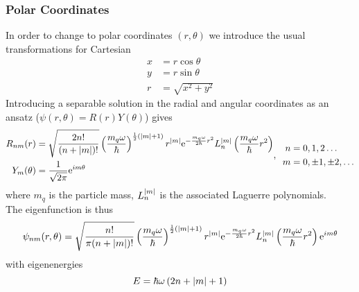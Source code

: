 \documentclass[a4paper, hidelinks, 10pt]{article}
\newcommand{\me}{\mathrm{e}} %
\begin{document}
\subsubsection{Polar Coordinates}
\label{ssub:Polar Coordinates}
    In order to change to polar coordinates $(r,\theta)$ we introduce the usual
    transformations for Cartesian
        \begin{equation}
            \begin{aligned}
                x &= r\cos{\theta} \\
                y &= r\sin{\theta} \\
                r &= \sqrt{x^2 + y^2}
            \end{aligned}
            \label{eq:polar}
        \end{equation}
    Introducing a separable solution in the radial and angular coordinates as
    an ansatz ($\psi(r,\theta)=R(r)Y(\theta)$) gives
        \begin{equation}
            \begin{aligned}
                R_{nm}(r) &= \sqrt{\frac{2n!}{(n+\abs{m})!}}
                \left(\frac{m_q\omega}{\hbar}\right)^{\frac{1}{2}\left(\abs{m}+1\right)}
                r^{\abs{m}} \me^{-\frac{m_q\omega}{2\hbar}r^2}
                L^{\abs{m}}_n\left(\frac{m_q\omega}{\hbar}r^2\right) \\
                Y_m(\theta) &= \frac{1}{\sqrt{2\pi}}\me^{im\theta}
            \end{aligned},\;\;
            \begin{aligned}
                n &= 0,1,2\dots \\
                m &= 0,\pm 1,\pm 2,\dots
            \end{aligned}
            \label{eq:polWavef}
        \end{equation}
    where $m_q$ is the particle mass, $L^{\abs{m}}_n$ is the associated
    Laguerre polynomials. \\
    The eigenfunction is thus
        \begin{equation}
            \psi_{nm}(r,\theta) = \sqrt{\frac{n!}{\pi(n+\abs{m})!}}
            \left(\frac{m_q\omega}{\hbar}\right)^{\frac{1}{2}\left(\abs{m}+1\right)}
            r^{\abs{m}} \me^{-\frac{m_q\omega}{2\hbar}r^2}
            L^{\abs{m}}_n\left(\frac{m_q\omega}{\hbar}r^2\right) \me^{im\theta}
            \label{eq:polEigf}
        \end{equation}
    with eigenenergies
        \begin{equation}
            E = \hbar\omega\left(2n + \abs{m} + 1\right)
            \label{eq:polE}
        \end{equation}
\end{document}
